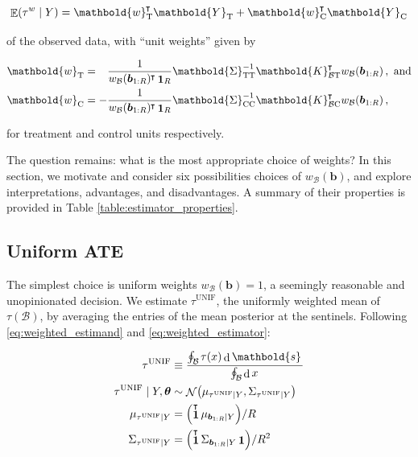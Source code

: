 \documentclass[letter]{article}
\let\originalleft\left
\let\originalright\right
\def\left#1{\mathopen{}\originalleft#1}
\def\right#1{\originalright#1\mathclose{}}
\DeclarePairedDelimiter{\parenthesis}{\lparen}{\rparen}
\newcommand{\del}[1]{\parenthesis*{#1}}
\DeclareMathOperator{\dif}{d}
\DeclareMathOperator{\E}{\mathbb{E}}
\DeclareMathOperator{\normal}{\mathcal{N}}
\DeclareMathOperator{\ones}{\mathbf{1}}
\newcommand*{\trans}{^{\mkern-1.5mu\intercal}}
\newcommand{\treat}{\mathrm{T}}
\newcommand{\ctrol}{\mathrm{C}}
\newcommand{\svec}{\mathbold{s}}
\newcommand{\wvec}{\mathbold{w}}
\newcommand{\Yvec}{\mathbold{Y}}
\newcommand{\yt}{\Yvec_{\treat}}
\newcommand{\yc}{\Yvec_{\ctrol}}
\newcommand{\border}{\mathcal{B}}
\newcommand{\sentinel}{\bm{b}}
\newcommand{\numsent}{R}
\newcommand{\sentinels}{\sentinel_{1:\numsent}}
\newcommand{\tauw}{\tau^{w}}
\newcommand{\unifavg}{\tau^{\mathrm{UNIF}}}
\newcommand{\eqlabel}[1]{\label{#1}}
\newcommand{\hyperparam}{\bm{\theta}}
\newcommand{\weightb}{w_{\border}}
\newcommand{\wt}{\wvec_{\treat}}
\newcommand{\wc}{\wvec_{\ctrol}}
\newcommand{\Kmat}{\mathbold{K}}
\newcommand{\SigmaMat}{\mathbold{\Sigma}}
\newcommand{\KBT}{\Kmat_{\border \treat}}
\newcommand{\KBC}{\Kmat_{\border \ctrol}}
\newcommand{\STT}{\SigmaMat_{\treat \treat}}
\newcommand{\SCC}{\SigmaMat_{\ctrol \ctrol}}
\begin{document}
\begin{equation}
\E\del{\tauw \mid Y} = \wt\trans \yt + \wc\trans \yc
\eqlabel{eq:unit_weights}
\end{equation}

of the observed data, with ``unit weights'' given by

\begin{equation}
\begin{split}
\wt &= \hphantom{-} \frac{1}{\weightb(\sentinels)\trans \ones_{\numsent}}
\STT^{-1} 
\KBT\trans \weightb(\sentinels) \,, 
\text{ and}
\\
\wc &= -\frac{1}{\weightb(\sentinels)\trans \ones_{\numsent}} 
\SCC^{-1} 
\KBC\trans \weightb(\sentinels) \,,
\end{split}
\eqlabel{eq:unit_weights_gp}
\end{equation}

for treatment and control units respectively.

The question remains: what is the most appropriate choice of weights? In this section, we motivate and consider six possibilities choices of \(\weightb(\sentinel)\), and explore interpretations, advantages, and disadvantages. A summary of their properties is provided in Table \ref{table:estimator_properties}.
    


    	\subsection{Uniform ATE}\label{uniform-ate}

The simplest choice is uniform weights \(\weightb(\sentinel)=1\), a seemingly reasonable and unopinionated decision.
We estimate \(\unifavg\), the uniformly weighted mean of \(\tau(\border)\), by averaging the entries of the mean posterior at the sentinels.
Following \eqref{eq:weighted_estimand} and \eqref{eq:weighted_estimator}:

\begin{equation}\begin{split}
    \unifavg &\equiv \frac{\oint_\border \left. \tau(x) \dif \svec \right.}
                          {\oint_\border \left. \dif x \right.} \\
    \unifavg \mid Y, \hyperparam &\sim \normal\del{\mu_{\unifavg \mid Y}, \Sigma_{\unifavg \mid Y}} \\
    \mu_{\unifavg \mid Y} &= \del{\ones\trans \mu_{\sentinels \mid Y}} / \numsent \\
    \Sigma_{\unifavg \mid Y} &= \del{\ones\trans \Sigma_{\sentinels \mid Y} \ones} / \numsent^2
\end{split}
\eqlabel{eq:unifavg}
\end{equation}
\end{document}
